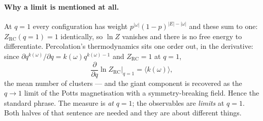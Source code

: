 \paragraph{Why a limit is mentioned at all.} At $q=1$ every configuration has
weight $p^{|\omega|}(1-p)^{|E|-|\omega|}$ and these sum to one:
$Z_{\mathrm{RC}}(q{=}1)=1$ identically, so $\ln Z$ vanishes and there is no free
energy to differentiate. Percolation's thermodynamics sits one order out, in
the derivative: since $\partial q^{k(\omega)}/\partial q=k(\omega)q^{k(\omega)-1}$
and $Z_{\mathrm{RC}}=1$ at $q=1$,
\begin{equation}
  \frac{\partial}{\partial q}\ln Z_{\mathrm{RC}}\Big|_{q=1}
    =\bigl\langle k(\omega)\bigr\rangle,
  \label{eq:dlnZ}
\end{equation}
the mean number of clusters --- and the giant component is recovered as the
$q\to1$ limit of the Potts magnetisation with a symmetry-breaking field. Hence
the standard phrase. The measure is \emph{at} $q=1$; the observables are
\emph{limits} at $q=1$. Both halves of that sentence are needed and they are
about different things.

